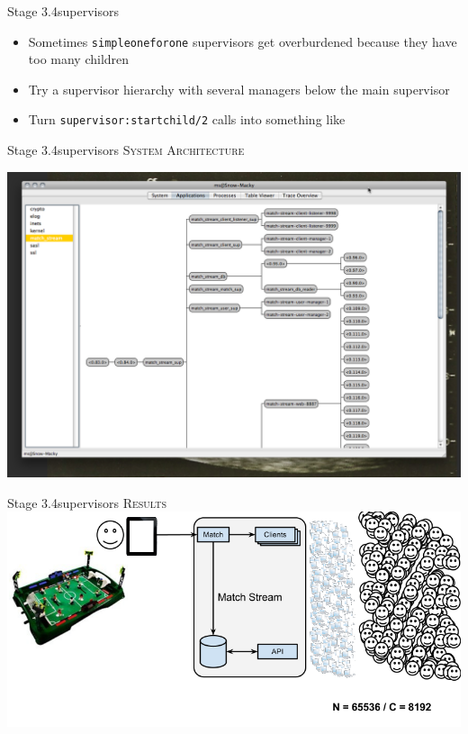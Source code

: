 \documentclass[utf8]{beamer}
\begin{document}
\begin{frame}{Stage 3.4}{supervisors}
	\begin{itemize}
		\item Sometimes \texttt{simple\textunderscore one\textunderscore for\textunderscore one} supervisors get \alert{overburdened} because they have too many children
		\item Try a supervisor hierarchy with several managers below the main supervisor
		\item Turn \texttt{supervisor:start\textunderscore child/2} calls into something like
		\startchild
	\end{itemize}
\end{frame}
\begin{frame}{Stage 3.4}{supervisors}
	\textsc{System Architecture}
	\begin{center}
		\includegraphics[height=.75\textheight]{img/running-late.png}
	\end{center}
\end{frame}
\begin{frame}{Stage 3.4}{supervisors}
	\textsc{Results}
	\includegraphics[top=-1,width=\textwidth]{img/MatchStream-3.png}
\end{frame}
\end{document}

